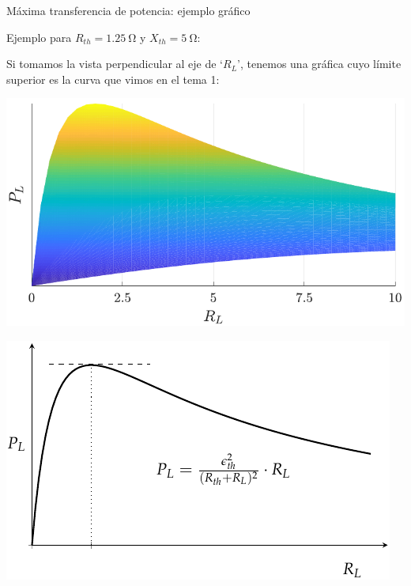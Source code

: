 \documentclass[aspectratio=169, usenames,svgnames,dvipsnames]{beamer}
\begin{document}
\begin{frame}{Máxima transferencia de potencia: \hspace{3mm}ejemplo gráfico}

Ejemplo para $R_{th}=\qty{1,25}{\ohm}$ y $X_{th}=\qty{5}{\ohm}$:

\vspace{3mm}

Si tomamos la \alert{vista perpendicular al eje de `$R_L$'}, tenemos una gráfica cuyo límite superior es la curva que vimos en el tema 1:

    \vspace{1mm}
    
    \begin{minipage}[c]{0.48\linewidth}
        \vspace{5mm}
        \begin{center}
            \includegraphics[height=0.48\textheight]{../figs/max_pot_Z_L_soloRL.pdf}
        \end{center}
    \end{minipage}
    \hfill%
    \begin{minipage}[c]{0.48\linewidth}
        \begin{center}
            \includegraphics[height=0.52\textheight]{../figs/max_pot_R_L_2.pdf}
        \end{center}
    \end{minipage}
\end{frame}
\end{document}
